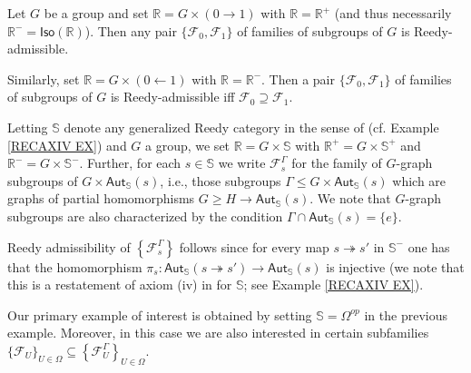 \documentclass[a4paper,10pt
 ,draft
]{article}%
\begin{document}
\begin{example}
	Let $G$ be a group and set $\mathbb{R} = G \times (0 \to 1)$ with $\mathbb{R} = \mathbb{R}^+$
	(and thus necessarily $\mathbb{R}^- = \mathsf{Iso}(\mathbb{R})$).
	Then any pair 
	$\{\mathcal{F}_0,\mathcal{F}_1\}$
	of families of subgroups of $G$ is Reedy-admissible.
	
	Similarly, set $\mathbb{R} = G \times (0 \leftarrow 1)$
	with $\mathbb{R} = \mathbb{R}^-$. Then a pair
	$\{\mathcal{F}_0,\mathcal{F}_1\}$
	of families of subgroups of $G$ is Reedy-admissible
	iff $\mathcal{F}_0 \supseteq \mathcal{F}_1$.
\end{example}


\begin{example}\label{GGRAPHREEDY EX}
	Letting $\mathbb{S}$ denote any generalized Reedy category in the sense of \cite[Def. 1.1]{BM11} (cf. Example \ref{RECAXIV EX}) and $G$ a group,
	we set $\mathbb{R} = G \times \mathbb{S}$
	with $\mathbb{R}^+ = G \times \mathbb{S}^+$ and 
	$\mathbb{R}^- = G \times \mathbb{S}^-$.
	Further, for each $s \in \mathbb{S}$ we write
	$\mathcal{F}_s^{\Gamma}$ for the family of 
	$G$-graph subgroups of $G \times \mathsf{Aut}_{\mathbb{S}}(s)$, i.e., those subgroups 
	$\Gamma \leq G \times \mathsf{Aut}_{\mathbb{S}}(s)$ 
	which are graphs of partial homomorphisms
	$G \geq H \to \mathsf{Aut}_{\mathbb{S}}(s)$. We note that $G$-graph subgroups are also characterized by the condition $\Gamma \cap \mathsf{Aut}_{\mathbb{S}}(s) = \{e\}$.
	
	Reedy admissibility of $\left\{\mathcal{F}_s^{\Gamma}\right\}$ follows since for every map 
	$s \twoheadrightarrow s'$ in $\mathbb{S}^-$ one has that the homomorphism
	$\pi_s \colon \mathsf{Aut}_{\mathbb{S}}(s \twoheadrightarrow s')
	\to \mathsf{Aut}_{\mathbb{S}}(s)$ is injective
	(we note that this is a restatement of axiom (iv) in \cite[Def. 1.1]{BM11} for $\mathbb{S}$; see Example \ref{RECAXIV EX}).
\end{example}

Our primary example of interest is obtained by setting
$\mathbb{S} = \Omega^{op}$ in the previous example.
Moreover, in this case we are also interested 
in certain subfamilies
$\{\mathcal{F}_U\}_{U \in \Omega}
\subseteq
\left\{\mathcal{F}_U^{\Gamma}\right\}_{U \in \Omega}$.
\end{document}
